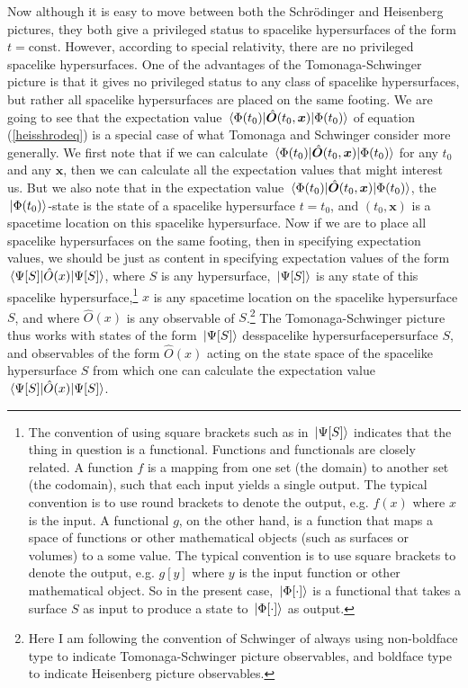 Now although it is easy to move between both the Schr\"{o}dinger and Heisenberg pictures, they both give a privileged status to spacelike hypersurfaces of the form $t=\text{const}$. However, according to special relativity, there are no privileged spacelike hypersurfaces. One of the advantages of the Tomonaga-Schwinger picture is that it gives no privileged status to any class of spacelike hypersurfaces, but rather all spacelike hypersurfaces are placed on the same footing. We are going to see that the expectation value $\ev*{\hat{\bm{O}}(t_0,\bm{x})}{\Phi(t_0)}$  of equation (\ref{heisshrodeq}) is a special case of what Tomonaga and Schwinger consider more generally. We first note that if we can calculate $\ev*{\hat{\bm{O}}(t_0,\bm{x})}{\Phi(t_0)}$ for any $t_0$ and any $\bm{x}$, then we can calculate all the expectation values that might interest us. But we also note that in the expectation value $\ev*{\hat{\bm{O}}(t_0,\bm{x})}{\Phi(t_0)}$,  the $\ket*{\Phi(t_0)}$-state is the state of a spacelike hypersurface $t=t_0$, and $(t_0,\bm{x})$ is a spacetime location on this spacelike hypersurface. Now if we are to place all spacelike hypersurfaces on the same footing, then in specifying expectation values, we should be just as content in specifying expectation values of the form $\ev*{\hat{O}(x)}{\Psi[S]}$, where $S$ is any hypersurface, $\ket*{\Psi[S]}$ is any state of this spacelike hypersurface,\footnote{The convention of using square brackets such as in $\ket*{\Psi[S]}$ indicates that the thing in question is a functional. Functions and functionals are closely related. A function $f$ is a mapping from one set (the domain) to another set (the codomain), such that each input yields a single output. The typical convention is to use round brackets to denote the output, e.g. $f(x)$ where $x$ is the input. A functional $g$, on the other hand, is a function that maps a space of functions or other mathematical objects (such as surfaces or volumes) to a some value. The typical convention is to use square brackets to denote the output, e.g. $g[y]$ where $y$ is the input function or other mathematical object. So in the present case, $\ket*{\Phi[\cdot]}$ is a functional that takes a surface $S$ as input to produce a state  to $\ket*{\Phi[\cdot]}$ as output.} $x$ is any spacetime location on the spacelike hypersurface $S$, and where $\hat{O}(x)$ is any observable of $S$.\footnote{Here I am following the convention of Schwinger of always using non-boldface type to indicate Tomonaga-Schwinger picture observables, and boldface type to indicate Heisenberg picture observables.} The Tomonaga-Schwinger picture thus works with states of the form $\ket*{\Psi[S]}$ desspacelike hypersurfacepersurface $S$, and observables of the form $\hat{O}(x)$ acting on the state space of the spacelike hypersurface $S$ from which one can calculate the expectation value $\ev*{\hat{O}(x)}{\Psi[S]}$.

